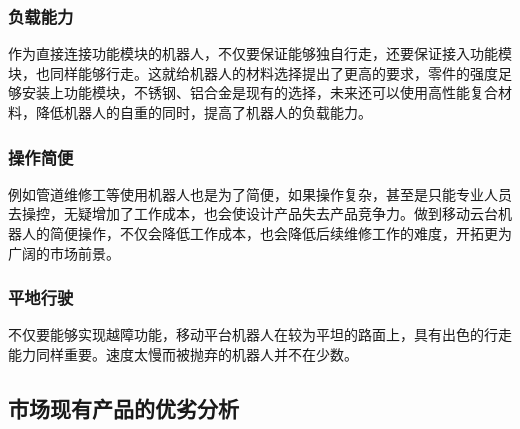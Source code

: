 \documentclass[12pt]{article}
\begin{document}
\begin{CJK}{UTF8}{gbsn}
\subsubsection{负载能力}
\label{sec:format}

作为直接连接功能模块的机器人，不仅要保证能够独自行走，还要保证接入功能模块，也同样能够行走。这就给机器人的材料选择提出了更高的要求，零件的强度足够安装上功能模块，不锈钢、铝合金是现有的选择，未来还可以使用高性能复合材料，降低机器人的自重的同时，提高了机器人的负载能力。
\subsubsection{操作简便}
\label{sec:format}

例如管道维修工等使用机器人也是为了简便，如果操作复杂，甚至是只能专业人员去操控，无疑增加了工作成本，也会使设计产品失去产品竞争力。做到移动云台机器人的简便操作，不仅会降低工作成本，也会降低后续维修工作的难度，开拓更为广阔的市场前景。
\subsubsection{平地行驶}
\label{sec:format}

不仅要能够实现越障功能，移动平台机器人在较为平坦的路面上，具有出色的行走能力同样重要。速度太慢而被抛弃的机器人并不在少数。

\subsection{市场现有产品的优劣分析}

\end{CJK}
\end{document}
